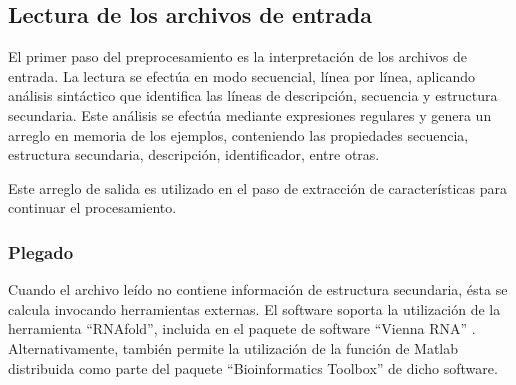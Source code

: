 %
%
%
\subsection{Lectura de los archivos de entrada}
%
El primer paso del preprocesamiento es la interpretación de los
archivos de entrada. La lectura se efectúa en modo secuencial, línea
por línea, aplicando análisis sintáctico que identifica las líneas de
descripción, secuencia y estructura secundaria.  Este análisis se
efectúa mediante expresiones regulares y genera un arreglo en memoria
de los ejemplos, conteniendo las propiedades secuencia, estructura
secundaria, descripción, identificador, entre otras.

Este arreglo de salida es utilizado en el paso de extracción de
características para continuar el procesamiento.
%
\subsubsection{Plegado}
%
Cuando el archivo leído no contiene información de estructura
secundaria, ésta se calcula invocando herramientas externas. El
software soporta la utilización de la herramienta ``RNAfold'',
incluida en el paquete de software ``Vienna RNA''
\cite{vienna}. Alternativamente, también permite la utilización de la
función de Matlab  distribuida como parte del paquete
``Bioinformatics Toolbox'' de dicho software.
